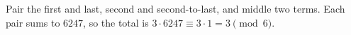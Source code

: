 Pair the first and last, second and second-to-last, and middle two terms. Each pair sums to $6247$, so the total is $3\cdot6247\equiv3\cdot1=\boxed3\pmod6$.
